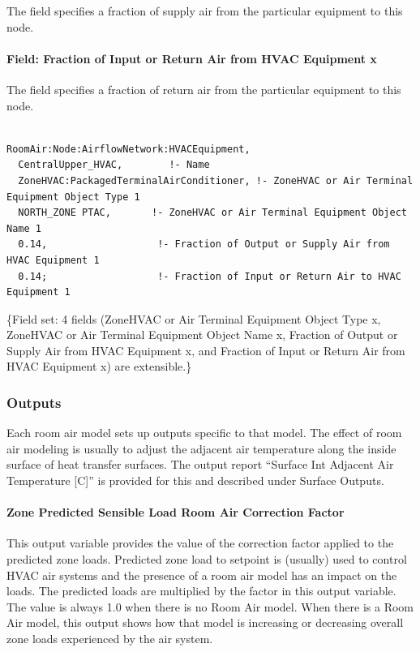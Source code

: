 The field specifies a fraction of supply air from the particular equipment to this node.

\paragraph{Field: Fraction of Input or Return Air from HVAC Equipment x}\label{field-fraction-of-input-or-return-air-from-hvac-equipment-x}

The field specifies a fraction of return air from the particular equipment to this node.

\begin{lstlisting}

RoomAir:Node:AirflowNetwork:HVACEquipment,
  CentralUpper_HVAC,        !- Name
  ZoneHVAC:PackagedTerminalAirConditioner, !- ZoneHVAC or Air Terminal Equipment Object Type 1
  NORTH_ZONE PTAC,       !- ZoneHVAC or Air Terminal Equipment Object Name 1
  0.14,                   !- Fraction of Output or Supply Air from HVAC Equipment 1
  0.14;                   !- Fraction of Input or Return Air to HVAC Equipment 1
\end{lstlisting}

\{Field set: 4 fields (ZoneHVAC or Air Terminal Equipment Object Type x, ZoneHVAC or Air Terminal Equipment Object Name x, Fraction of Output or Supply Air from HVAC Equipment x, and Fraction of Input or Return Air from HVAC Equipment x) are extensible.\}

\subsubsection{Outputs}\label{outputs-1-023}

Each room air model sets up outputs specific to that model. The effect of room air modeling is usually to adjust the adjacent air temperature along the inside surface of heat transfer surfaces. The output report ``Surface Int Adjacent Air Temperature {[}C{]}'' is provided for this and described under Surface Outputs.

\paragraph{Zone Predicted Sensible Load Room Air Correction Factor}\label{zone-predicted-sensible-load-room-air-correction-factor}

This output variable provides the value of the correction factor applied to the predicted zone loads. Predicted zone load to setpoint is (usually) used to control HVAC air systems and the presence of a room air model has an impact on the loads. The predicted loads are multiplied by the factor in this output variable. The value is always 1.0 when there is no Room Air model. When there is a Room Air model, this output shows how that model is increasing or decreasing overall zone loads experienced by the air system.

